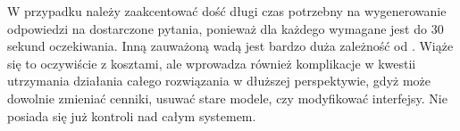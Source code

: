 W przypadku  należy zaakcentować dość długi czas potrzebny na wygenerowanie odpowiedzi na dostarczone pytania, ponieważ dla każdego wymagane jest do 30 sekund oczekiwania. Inną zauważoną wadą jest bardzo duża zależność od . Wiąże się to oczywiście z kosztami, ale wprowadza również komplikacje w kwestii utrzymania działania całego rozwiązania w dłuższej perspektywie, gdyż  może dowolnie zmieniać cenniki, usuwać stare modele, czy modyfikować interfejsy. Nie posiada się już kontroli nad całym systemem.